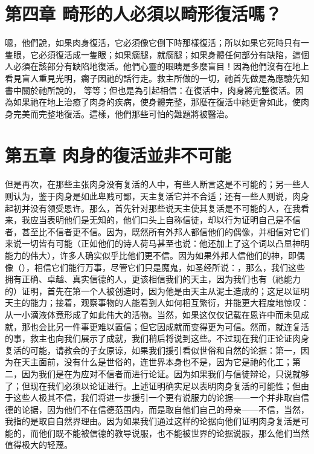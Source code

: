 
\section{第四章 畸形的人必須以畸形復活嗎？}

嗯，他們說，如果肉身復活，它必須像它倒下時那樣復活；所以如果它死時只有一隻眼，它必須復活成一隻眼；如果瘸腿，就瘸腿；如果身體任何部分有缺陷，這個人必須在該部分有缺陷地復活。他們心靈的眼睛是多麼盲目！因為他們沒有在地上看見盲人重見光明，瘸子因祂的話行走。救主所做的一切，祂首先做是為應驗先知書中關於祂所說的， 等等；但也是為引起相信：在復活中，肉身將完整復活。因為如果祂在地上治癒了肉身的疾病，使身體完整，那麼在復活中祂更會如此，使肉身完美而完整地復活。這樣，他們那些可怕的難題將被醫治。\par


\section{第五章 肉身的復活並非不可能}

但是再次，在那些主张肉身没有复活的人中，有些人断言这是不可能的；另一些人则认为，鉴于肉身是如此卑贱可鄙，天主复活它并不合适；还有一些人则说，肉身起初并没有领受恩许。那么，首先针对那些说天主使其复活是不可能的人，在我看来，我应当表明他们是无知的，他们口头上自称信徒，却以行为证明自己是不信者，甚至比不信者更不信。因为，既然所有外邦人都信他们的偶像，并相信对它们来说一切皆有可能（正如他们的诗人荷马甚至也说：他还加上了这个词以凸显神明能力的伟大），许多人确实似乎比他们更不信。因为如果外邦人信他们的神，即偶像（），相信它们能行万事，尽管它们只是魔鬼，如圣经所说：，那么，我们这些拥有正确、卓越、真实信德的人，更该相信我们的天主，因为我们也有（祂能力的）证明，首先在第一个人被创造时，因为他是由天主从泥土造成的；这足以证明天主的能力；接着，观察事物的人能看到人如何相互繁衍，并能更大程度地惊叹：从一小滴液体竟形成了如此伟大的活物。当然，如果这仅仅记载在恩许中而未见成就，那也会比另一件事更难以置信；但它因成就而变得更为可信。然而，就连复活的事，救主也向我们展示了成就，我们稍后将说到这些。不过现在我们正论证肉身复活的可能，请教会的子女原谅，如果我们援引看似世俗和自然的论据：第一，因为在天主面前，没有什么是世俗的，连世界本身也不是，因为它是祂的化工；第二，因为我们是在为应对不信者而进行论证。因为如果我们与信徒辩论，只说就够了；但现在我们必须以论证进行。上述证明确实足以表明肉身复活的可能性；但由于这些人极其不信，我们将进一步援引一个更有说服力的论据——一个并非取自信德的论据，因为他们不在信德范围内，而是取自他们自己的母亲——不信，当然，我指的是取自自然界理由。因为如果我们通过这样的论据向他们证明肉身复活是可能的，而他们既不能被信德的教导说服，也不能被世界的论据说服，那么他们当然值得极大的轻蔑。\par

